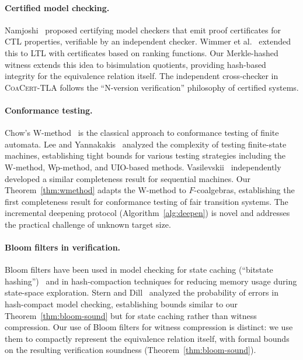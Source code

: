 \documentclass[11pt]{article}
\newcommand{\CoaCert}{\textsc{CoaCert-TLA}}
\begin{document}
\paragraph{Certified model checking.}
Namjoshi~\cite{Namjoshi01} proposed certifying model checkers that emit
proof certificates for CTL properties, verifiable by an independent checker.
Wimmer et al.~\cite{WimmerLBR15} extended this to LTL with certificates
based on ranking functions.
Our Merkle-hashed witness extends this idea to bisimulation
quotients, providing hash-based integrity for the equivalence relation
itself.
The independent cross-checker in \CoaCert{} follows the ``N-version
verification'' philosophy of certified systems.

\paragraph{Conformance testing.}
Chow's W-method~\cite{Chow78} is the classical approach to conformance
testing of finite automata.
Lee and Yannakakis~\cite{LeeY96} analyzed the complexity of testing
finite-state machines, establishing tight bounds for various testing
strategies including the W-method, Wp-method, and UIO-based methods.
Vasilevskii~\cite{Vasilevskii73} independently developed a similar
completeness result for sequential machines.
Our Theorem~\ref{thm:wmethod} adapts the W-method to $F$-coalgebras,
establishing the first completeness result for conformance testing of
fair transition systems.
The incremental deepening protocol (Algorithm~\ref{alg:deepen}) is novel
and addresses the practical challenge of unknown target size.

\paragraph{Bloom filters in verification.}
Bloom filters have been used in model checking for state caching
(``bitstate hashing'')~\cite{Holzmann98} and in hash-compaction
techniques for reducing memory usage during state-space exploration.
Stern and Dill~\cite{SternD95} analyzed the probability of errors in
hash-compact model checking, establishing bounds similar to our
Theorem~\ref{thm:bloom-sound} but for state caching rather than
witness compression.
Our use of Bloom filters for witness compression is distinct: we use
them to compactly represent the equivalence relation itself, with
formal bounds on the resulting verification soundness
(Theorem~\ref{thm:bloom-sound}).
\end{document}
